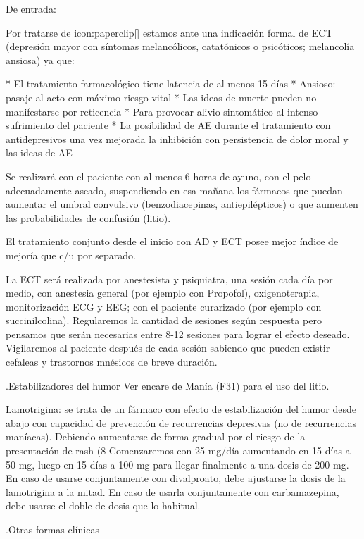 De entrada:

Por tratarse de icon:paperclip[] estamos ante una indicación formal de ECT (depresión mayor con síntomas melancólicos, catatónicos o psicóticos; melancolía ansiosa) ya que:

* El tratamiento farmacológico tiene latencia de al menos 15 días
* Ansioso: pasaje al acto con máximo riesgo vital
* Las ideas de muerte pueden no manifestarse por reticencia
* Para provocar alivio sintomático al intenso sufrimiento del paciente
* La posibilidad de AE durante el tratamiento con antidepresivos una vez mejorada la inhibición con persistencia de dolor moral y las ideas de AE

Se realizará con el paciente con al menos 6 horas de ayuno, con el pelo adecuadamente aseado, suspendiendo en esa mañana los fármacos que puedan aumentar el umbral convulsivo (benzodiacepinas, antiepilépticos) o que aumenten las probabilidades de confusión (litio).

El tratamiento conjunto desde el inicio con AD y ECT posee mejor índice de mejoría que c/u por separado.

La ECT será realizada por anestesista y psiquiatra, una sesión cada día por medio, con anestesia general (por ejemplo con Propofol), oxigenoterapia, monitorización ECG y EEG; con el paciente curarizado (por ejemplo con succinilcolina). Regularemos la cantidad de sesiones según respuesta pero pensamos que serán necesarias entre 8-12 sesiones para lograr el efecto deseado. Vigilaremos al paciente después de cada sesión sabiendo que pueden existir cefaleas y trastornos mnésicos de breve duración.

.Estabilizadores del humor
Ver encare de Manía (F31) para el uso del litio.

Lamotrigina: se trata de un fármaco con efecto de estabilización del humor desde abajo con capacidad de prevención de recurrencias depresivas (no de recurrencias maníacas). Debiendo aumentarse de forma gradual por el riesgo de la presentación de rash (8%
Comenzaremos con 25 mg/día aumentando en 15 días a 50 mg, luego en 15 días a 100 mg para llegar finalmente a una dosis de 200 mg. En caso de usarse conjuntamente con divalproato, debe ajustarse la dosis de la lamotrigina a la mitad. En caso de usarla conjuntamente con carbamazepina, debe usarse el doble de dosis que lo habitual.

.Otras formas clínicas

